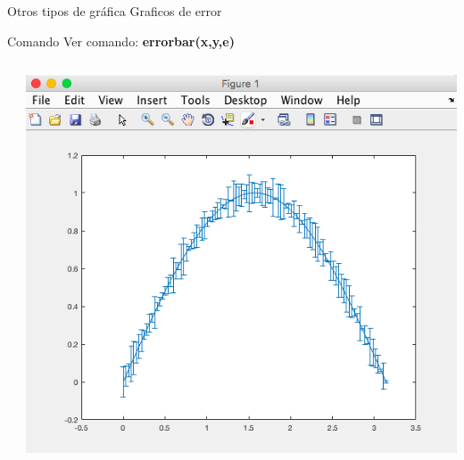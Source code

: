 \documentclass{bredelebeamer}
\begin{document}
\begin{frame}{Otros tipos de gráfica}
Graficos de error
\begin{exampleblock}{Comando}
Ver comando: \textbf{errorbar(x,y,e)}
\end{exampleblock}
\begin{columns}
\begin{column}{0.5\textwidth}
\begin{center}
\end{center}
\end{column}
\begin{column}{0.5\textwidth}
\begin{center}
\includegraphics[scale=0.2]{images/pantalla27.png}
\end{center}
\end{column}
\end{columns}
\end{frame}




\end{document}
